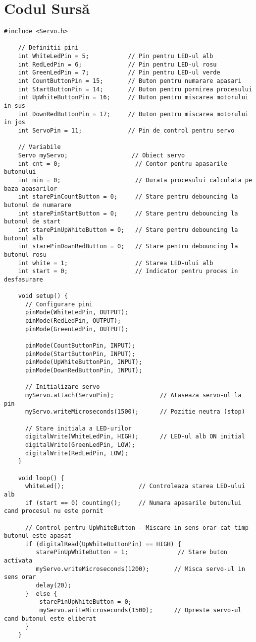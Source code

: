 \chapter{Codul Sursă}
\label{cha:app1}

\begin{lstlisting}[style=arduino, caption={}]
    #include <Servo.h>
    
    // Definitii pini
    int WhiteLedPin = 5;           // Pin pentru LED-ul alb
    int RedLedPin = 6;             // Pin pentru LED-ul rosu
    int GreenLedPin = 7;           // Pin pentru LED-ul verde
    int CountButtonPin = 15;       // Buton pentru numarare apasari
    int StartButtonPin = 14;       // Buton pentru pornirea procesului
    int UpWhiteButtonPin = 16;     // Buton pentru miscarea motorului in sus
    int DownRedButtonPin = 17;     // Buton pentru miscarea motorului in jos
    int ServoPin = 11;             // Pin de control pentru servo
    
    // Variabile
    Servo myServo;                  // Obiect servo
    int cnt = 0;                     // Contor pentru apasarile butonului
    int min = 0;                     // Durata procesului calculata pe baza apasarilor
    int starePinCountButton = 0;     // Stare pentru debouncing la butonul de numarare
    int starePinStartButton = 0;     // Stare pentru debouncing la butonul de start
    int starePinUpWhiteButton = 0;   // Stare pentru debouncing la butonul alb
    int starePinDownRedButton = 0;   // Stare pentru debouncing la butonul rosu
    int white = 1;                   // Starea LED-ului alb
    int start = 0;                   // Indicator pentru proces in desfasurare
    
    void setup() {
      // Configurare pini
      pinMode(WhiteLedPin, OUTPUT);
      pinMode(RedLedPin, OUTPUT);
      pinMode(GreenLedPin, OUTPUT);
    
      pinMode(CountButtonPin, INPUT);
      pinMode(StartButtonPin, INPUT);
      pinMode(UpWhiteButtonPin, INPUT);
      pinMode(DownRedButtonPin, INPUT);
    
      // Initializare servo
      myServo.attach(ServoPin);             // Ataseaza servo-ul la pin
      myServo.writeMicroseconds(1500);      // Pozitie neutra (stop)
    
      // Stare initiala a LED-urilor
      digitalWrite(WhiteLedPin, HIGH);      // LED-ul alb ON initial
      digitalWrite(GreenLedPin, LOW);
      digitalWrite(RedLedPin, LOW);
    }
    
    void loop() {
      whiteLed();                     // Controleaza starea LED-ului alb
      if (start == 0) counting();     // Numara apasarile butonului cand procesul nu este pornit
    
      // Control pentru UpWhiteButton - Miscare in sens orar cat timp butonul este apasat
      if (digitalRead(UpWhiteButtonPin) == HIGH) {
         starePinUpWhiteButton = 1;              // Stare buton activata
         myServo.writeMicroseconds(1200);       // Misca servo-ul in sens orar
         delay(20);
      }  else {
          starePinUpWhiteButton = 0;
          myServo.writeMicroseconds(1500);      // Opreste servo-ul cand butonul este eliberat
      }
    }
    \end{lstlisting}
    

